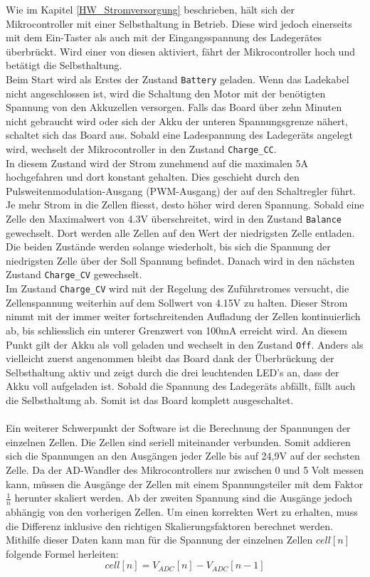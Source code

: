 Wie im Kapitel \ref{HW_Stromversorgung} beschrieben, hält sich der Mikrocontroller mit einer Selbsthaltung in Betrieb. Diese wird jedoch einerseits mit dem Ein-Taster als auch mit der Eingangsspannung des Ladegerätes überbrückt. Wird einer von diesen aktiviert, fährt der Mikrocontroller hoch und betätigt die Selbsthaltung. \\
Beim Start wird als Erstes der Zustand \texttt{Battery} geladen. Wenn das Ladekabel nicht angeschlossen ist, wird die Schaltung den Motor mit der benötigten Spannung von den Akkuzellen versorgen. Falls das Board über zehn Minuten nicht gebraucht wird oder sich der Akku der unteren Spannungsgrenze nähert, schaltet sich das Board aus. Sobald eine Ladespannung des Ladegeräts angelegt wird, wechselt der Mikrocontroller in den Zustand \texttt{Charge\_CC}.\\
In diesem Zustand wird der Strom zunehmend auf die maximalen 5A hochgefahren und dort konstant gehalten. Dies geschieht durch den Pulsweitenmodulation-Ausgang (PWM-Ausgang) der auf den Schaltregler führt. Je mehr Strom in die Zellen fliesst, desto höher wird deren Spannung. Sobald eine Zelle den Maximalwert von 4.3V überschreitet, wird in den Zustand \texttt{Balance} gewechselt. Dort werden alle Zellen auf den Wert der niedrigsten Zelle entladen. Die beiden Zustände werden solange wiederholt, bis sich die  Spannung der niedrigsten Zelle über der Soll Spannung befindet.  Danach wird in den nächsten Zustand \texttt{Charge\_CV} gewechselt. \\
Im Zustand \texttt{Charge\_CV} wird mit der Regelung des Zuführstromes versucht, die Zellenspannung weiterhin auf dem Sollwert von 4.15V zu halten. Dieser Strom nimmt mit der immer weiter fortschreitenden Aufladung der Zellen kontinuierlich ab, bis schliesslich ein unterer Grenzwert von 100mA erreicht wird. An diesem Punkt gilt der Akku als voll geladen und wechselt in den Zustand \texttt{Off}.
Anders als vielleicht zuerst angenommen bleibt das Board dank der Überbrückung der Selbsthaltung aktiv und zeigt durch die drei leuchtenden LED’s an, dass der Akku voll aufgeladen ist. Sobald  die Spannung des Ladegeräts abfällt, fällt auch die Selbsthaltung ab. Somit ist das Board komplett ausgeschaltet.
\\\\
Ein weiterer Schwerpunkt der Software ist die Berechnung der Spannungen der einzelnen Zellen. Die Zellen sind seriell miteinander verbunden. Somit addieren sich die Spannungen an den Ausgängen jeder Zelle bis auf 24,9V auf der sechsten Zelle. Da der AD-Wandler des Mikrocontrollers nur zwischen 0 und 5 Volt messen kann, müssen die Ausgänge der Zellen mit einem Spannungsteiler mit dem Faktor \(\frac 1n\) herunter skaliert werden. Ab der zweiten Spannung sind die Ausgänge jedoch abhängig von den vorherigen Zellen. Um einen korrekten Wert zu erhalten, muss die Differenz inklusive den richtigen Skalierungsfaktoren berechnet werden. Mithilfe dieser Daten kann man für die Spannung der einzelnen Zellen $cell[n]$ folgende Formel herleiten:
\begin{equation}
	cell[n] = V_{ADC}[n] - V_{ADC}[n-1]
	\label{eq:CellNSpannung}
\end{equation}

